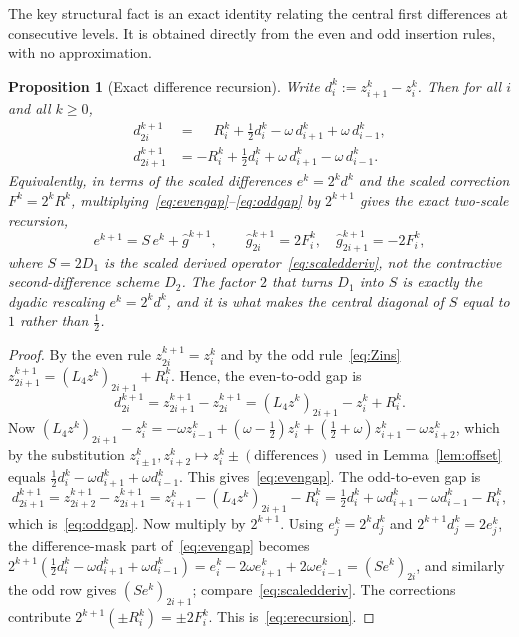 \documentclass{article}
\theoremstyle{plain}
\newtheorem{proposition}[theorem]{Proposition}
\theoremstyle{definition}
\newcommand{\Lop}{L_4}
\begin{document}
The key structural fact is an exact identity relating the central first
differences at consecutive levels. It is obtained directly from the even and
odd insertion rules, with no approximation.

\begin{proposition}[Exact difference recursion]\label{prop:erecursion}
Write $d_i^k:=z_{i+1}^k-z_i^k$. Then for all $i$ and all $k\geq 0$,
\begin{align}
  d_{2i}^{k+1}   &= \phantom{-}R_i^k
    + \tfrac12 d_i^k - \omega\, d_{i+1}^k + \omega\, d_{i-1}^k,
    \label{eq:evengap}\\
  d_{2i+1}^{k+1} &= -R_i^k
    + \tfrac12 d_i^k + \omega\, d_{i+1}^k - \omega\, d_{i-1}^k.
    \label{eq:oddgap}
\end{align}
Equivalently, in terms of the scaled differences $e^k=2^k d^k$ and the scaled
correction $F^k=2^k R^k$, multiplying~\eqref{eq:evengap}--\eqref{eq:oddgap} by
$2^{k+1}$ gives the exact two-scale recursion,
\begin{equation}\label{eq:erecursion}
  e^{k+1} = S\,e^{k} + \hat g^{k+1},
  \qquad
  \hat g_{2i}^{k+1} = 2 F_i^k,
  \quad
  \hat g_{2i+1}^{k+1} = -2 F_i^k,
\end{equation}
where $S=2D_1$ is the \emph{scaled derived operator}~\eqref{eq:scaledderiv},
\emph{not} the contractive second-difference scheme $D_2$. The factor $2$ that
turns $D_1$ into $S$ is exactly the dyadic rescaling $e^k=2^k d^k$, and it is
what makes the central diagonal of $S$ equal to $1$ rather than $\tfrac12$.
\end{proposition}

\begin{proof}
By the even rule $z_{2i}^{k+1}=z_i^k$ and by the odd
rule~\eqref{eq:Zins} $z_{2i+1}^{k+1}=(\Lop z^k)_{2i+1}+R_i^k$. Hence, the
even-to-odd gap is
\[
  d_{2i}^{k+1}=z_{2i+1}^{k+1}-z_{2i}^{k+1}
  =(\Lop z^k)_{2i+1}-z_i^k+R_i^k .
\]
Now $(\Lop z^k)_{2i+1}-z_i^k=-\omega z_{i-1}^k+(\omega-\tfrac12)z_i^k
+(\tfrac12+\omega)z_{i+1}^k-\omega z_{i+2}^k$, which by the substitution
$z_{i\pm1}^k,z_{i+2}^k\mapsto z_i^k\pm(\text{differences})$ used in
Lemma~\ref{lem:offset} equals $\tfrac12 d_i^k-\omega d_{i+1}^k+\omega
d_{i-1}^k$. This gives~\eqref{eq:evengap}. The odd-to-even gap is
\[
  d_{2i+1}^{k+1}=z_{2i+2}^{k+1}-z_{2i+1}^{k+1}
  =z_{i+1}^k-(\Lop z^k)_{2i+1}-R_i^k
  =\tfrac12 d_i^k+\omega d_{i+1}^k-\omega d_{i-1}^k-R_i^k,
\]
which is~\eqref{eq:oddgap}. Now multiply by $2^{k+1}$. Using $e_j^k=2^k d_j^k$
and $2^{k+1}d_j^k=2e_j^k$, the difference-mask part of~\eqref{eq:evengap}
becomes $2^{k+1}(\tfrac12 d_i^k-\omega d_{i+1}^k+\omega d_{i-1}^k)
=e_i^k-2\omega e_{i+1}^k+2\omega e_{i-1}^k=(Se^k)_{2i}$, and similarly the
odd row gives $(Se^k)_{2i+1}$; compare~\eqref{eq:scaledderiv}. The corrections
contribute $2^{k+1}(\pm R_i^k)=\pm 2 F_i^k$. This is~\eqref{eq:erecursion}.
\end{proof}
\end{document}
